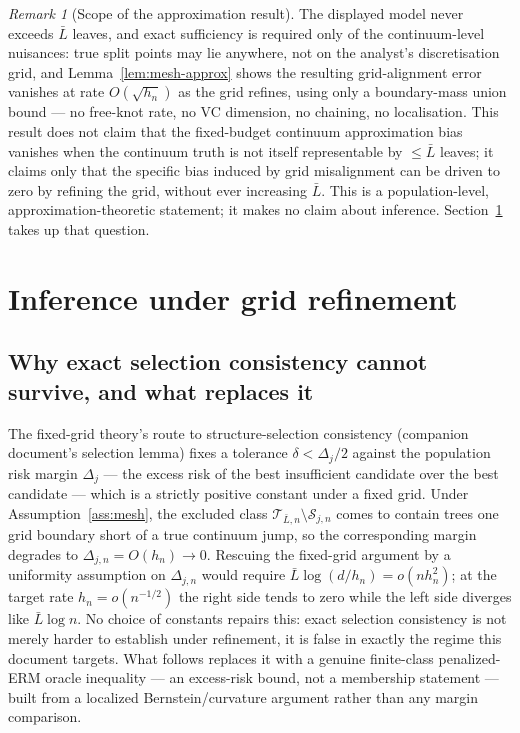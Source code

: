\documentclass[11pt]{article}
\theoremstyle{plain}
\theoremstyle{definition}
\theoremstyle{remark}
\newtheorem{remark}[theorem]{Remark}
\newcommand{\cT}{\mathcal{T}}
\newcommand{\cS}{\mathcal{S}}
\begin{document}
\begin{remark}[Scope of the approximation result]
The displayed model never exceeds $\bar L$ leaves, and exact sufficiency is
required only of the continuum-level nuisances: true split points may lie
anywhere, not on the analyst's discretisation grid, and
Lemma~\ref{lem:mesh-approx} shows the resulting grid-alignment error
vanishes at rate $O(\sqrt{h_n})$ as the grid refines, using only a
boundary-mass union bound --- no free-knot rate, no VC dimension, no
chaining, no localisation. This result does not claim that the fixed-budget
continuum approximation bias vanishes when the continuum truth is not
itself representable by $\le\bar L$ leaves; it claims only that the
specific bias induced by grid misalignment can be driven to zero by
refining the grid, without ever increasing $\bar L$. This is a
population-level, approximation-theoretic statement; it makes no claim
about inference. Section~\ref{sec:grid-inference} takes up that question.
\end{remark}

\section{Inference under grid refinement}\label{sec:grid-inference}

\subsection{Why exact selection consistency cannot survive, and what
replaces it}\label{sec:grid-inference-why}

The fixed-grid theory's route to structure-selection consistency
(companion document's selection lemma) fixes a tolerance $\delta<\Delta_j/2$
against the population risk margin $\Delta_j$ --- the excess risk of the
best insufficient candidate over the best candidate --- which is a strictly
positive constant under a fixed grid. Under Assumption~\ref{ass:mesh}, the
excluded class $\cT_{\bar L,n}\setminus\cS_{j,n}$ comes to contain trees one
grid boundary short of a true continuum jump, so the corresponding margin
degrades to $\Delta_{j,n}=O(h_n)\to0$. Rescuing the fixed-grid argument by a
uniformity assumption on $\Delta_{j,n}$ would require
$\bar L\log(d/h_n)=o(nh_n^2)$; at the target rate $h_n=o(n^{-1/2})$ the
right side tends to zero while the left side diverges like $\bar L\log n$.
No choice of constants repairs this: exact selection consistency is not
merely harder to establish under refinement, it is false in exactly the
regime this document targets. What follows replaces it with a genuine
finite-class penalized-ERM oracle inequality --- an excess-risk bound, not a
membership statement --- built from a localized Bernstein/curvature
argument rather than any margin comparison.
\end{document}
